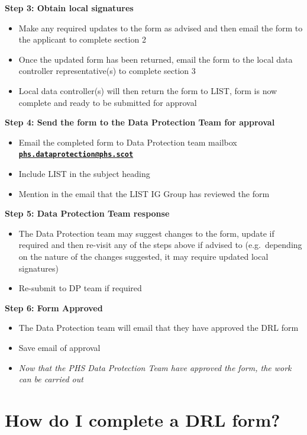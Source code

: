 \documentclass[
]{book}
\begin{document}
\textbf{Step 3: Obtain local signatures}

\begin{itemize}
\item
  Make any required updates to the form as advised and then email the form to the applicant to complete section 2
\item
  Once the updated form has been returned, email the form to the local data controller representative(s) to complete section 3
\item
  Local data controller(s) will then return the form to LIST, form is now complete and ready to be submitted for approval
\end{itemize}

\textbf{Step 4: Send the form to the Data Protection Team for approval}

\begin{itemize}
\item
  Email the completed form to Data Protection team mailbox \textbf{\href{mailto:phs.dataprotection@phs.scot}{\nolinkurl{phs.dataprotection@phs.scot}}}
\item
  Include LIST in the subject heading
\item
  Mention in the email that the LIST IG Group has reviewed the form
\end{itemize}

\textbf{Step 5: Data Protection Team response}

\begin{itemize}
\item
  The Data Protection team may suggest changes to the form, update if required and then re-visit any of the steps above if advised to (e.g.~depending on the nature of the changes suggested, it may require updated local signatures)
\item
  Re-submit to DP team if required
\end{itemize}

\textbf{Step 6: Form Approved}

\begin{itemize}
\item
  The Data Protection team will email that they have approved the DRL form
\item
  Save email of approval
\item
  \emph{Now that the PHS Data Protection Team have approved the form, the work can be carried out}
\end{itemize}

\hypertarget{drlcompletion}{%
\section{How do I complete a DRL form?}\label{drlcompletion}}
\end{document}
